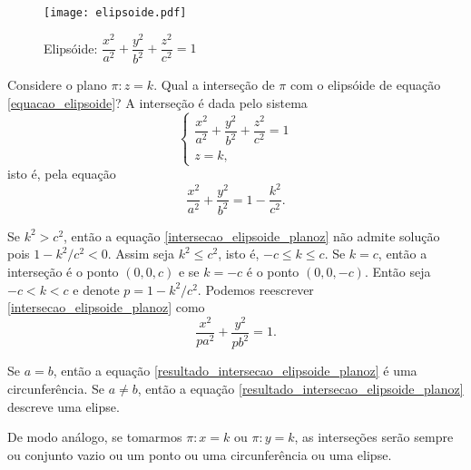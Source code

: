 \begin{figure}[h]
	\centering
	\caption{Elips\'oide: $\dfrac{x^2}{a^2} + \dfrac{y^2}{b^2} + \dfrac{z^2}{c^2} = 1$}
	\texttt{[image: elipsoide.pdf]}
\end{figure}

Considere o plano $\pi: z = k$. Qual a interse\c{c}\~ao de $\pi$ com o elips\'oide de equa\c{c}\~ao \eqref{equacao_elipsoide}? A interse\c{c}\~ao \'e dada pelo sistema
\[
	\begin{cases}
		\dfrac{x^2}{a^2} + \dfrac{y^2}{b^2} + \dfrac{z^2}{c^2} = 1\\
		z = k,
	\end{cases}
\]
isto \'e, pela equa\c{c}\~ao
\begin{equation}\label{intersecao_elipsoide_planoz}
	\dfrac{x^2}{a^2} + \dfrac{y^2}{b^2} = 1 - \dfrac{k^2}{c^2}.
\end{equation}

Se $k^2 > c^2$, ent\~ao a equa\c{c}\~ao \eqref{intersecao_elipsoide_planoz} n\~ao admite solu\c{c}\~ao pois $1 - k^2/c^2 < 0$. Assim seja $k^2 \le c^2$, isto \'e, $-c \le k \le c$. Se $k = c$, ent\~ao a interse\c{c}\~ao \'e o ponto $(0,0,c)$ e se $k = -c$ \'e o ponto $(0,0,-c)$. Ent\~ao seja $-c < k < c$ e denote $p = 1 - k^2/c^2$. Podemos reescrever \eqref{intersecao_elipsoide_planoz} como
\begin{equation}\label{resultado_intersecao_elipsoide_planoz}
	\dfrac{x^2}{pa^2} + \dfrac{y^2}{pb^2} = 1.
\end{equation}

Se $a = b$, ent\~ao a equa\c{c}\~ao \eqref{resultado_intersecao_elipsoide_planoz} \'e uma circunfer\^encia. Se $a \ne b$, ent\~ao a equa\c{c}\~ao \eqref{resultado_intersecao_elipsoide_planoz} descreve uma elipse.

De modo an\'alogo, se tomarmos $\pi : x = k$ ou $\pi : y = k$, as interse\c{c}\~oes ser\~ao sempre ou conjunto vazio ou um ponto ou uma circunfer\^encia ou uma elipse.



